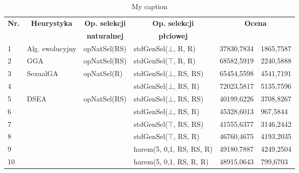 \documentclass[./FM_mgr.tex]{subfiles}
\begin{document}
\begin{table}[h]
	\centering
	\caption{My caption}
	\label{my-label}
	\begin{tabular}{|l|l|l|l|r@{$\pm$}l|}
		\hline
		\multicolumn{1}{|c|}{\multirow{2}{*}{{\bf Nr.}}} &\multicolumn{1}{c|}{\multirow{2}{*}{{\bf Heurystyka}}} & \multicolumn{1}{c|}{{\bf Op. selekcji}} & \multicolumn{1}{c|}{{\bf Op. selekcji}} & \multicolumn{2}{c|}{\multirow{2}{*}{{\bf Ocena}}} \\
		& \multicolumn{1}{c|}{}                                  & \multicolumn{1}{c|}{{\bf naturalnej}}          & \multicolumn{1}{c|}{{\bf płciowej}}        & \multicolumn{2}{c|}{}                             \\ \hline \hline
		1 & Alg. ewolucyjny                    & opNatSel(RS)                                          & stdGenSel($\bot$, R, R)                                 & 37830,7834      & 1865,7587      \\ \hline
		2 & GGA                                    & opNatSel(RS)                                          & stdGenSel($\top$, R, R)                                 & 68582,5919      & 2240,5888      \\ \hline
		3 & \multirow{2}{*}{SexualGA}              & \multirow{2}{*}{opNatSel(R)}                          & stdGenSel($\bot$, RS, RS)                               & 65454,5598      & 4541,7191      \\ \cline{1-1}\cline{4-6} 
		4 & &                                                       & stdGenSel($\bot$, RS, R)                                & 72023,5817      & 5135,7596      \\ \hline
		5 & \multirow{6}{*}{DSEA}                  & \multirow{6}{*}{opNatSel(RS)}                         & stdGenSel($\bot$, RS, RS)                               & 40199,6226      & 3708,8267      \\ \cline{1-1}\cline{4-6} 
		6 & &                                                       & stdGenSel($\bot$, RS, R)                                & 45328,6013      & 967,5844       \\ \cline{1-1}\cline{4-6} 
		7 & &                                                       & stdGenSel($\top$, RS, RS)                               & 41555,6377      & 3146,2442      \\ \cline{1-1}\cline{4-6} 
		8 & &                                                       & stdGenSel($\top$, RS, R)                                & 46760,4675      & 4193,2035      \\ \cline{1-1}\cline{4-6} 
		9 & &                                                       & harem(5, 0,1, RS, RS, R)                                & 49180,7887      & 4249,2504      \\ \cline{1-1}\cline{4-6} 
		10 & &                                                       & harem(5, 0,1, RS, R, R)                                 & 48915,0643      & 799,6703       \\ \hline
	\end{tabular}
\end{table}
\end{document}
